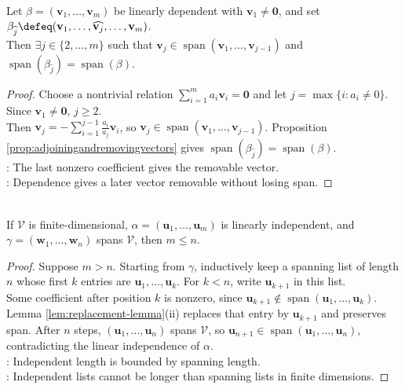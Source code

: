 \begin{lemma} \label{lem:lineardependencelemma} \\
Let $\beta=(\mathbf{v}_1,\ldots,\mathbf{v}_m)$ be linearly dependent with $\mathbf{v}_1\neq\mathbf{0}$, and set $\beta_{\widehat{j}}\defeq(\mathbf{v}_1,\ldots,\widehat{\mathbf{v}_j},\ldots,\mathbf{v}_m)$.\\
Then $\exists j\in\{2,\ldots,m\}$ such that $\mathbf{v}_j\in\operatorname{span}(\mathbf{v}_1,\ldots,\mathbf{v}_{j-1})$ and $\operatorname{span}(\beta_{\widehat{j}})=\operatorname{span}(\beta)$.
\begin{proof}
Choose a nontrivial relation $\sum\limits_{i=1}^m a_i\mathbf{v}_i=\mathbf{0}$ and let $j=\max\{i:a_i\neq0\}$. Since $\mathbf{v}_1\neq\mathbf{0}$, $j\geq2$.\\
Then $\mathbf{v}_j=-\sum\limits_{i=1}^{j-1}\frac{a_i}{a_j}\mathbf{v}_i$, so $\mathbf{v}_j\in\operatorname{span}(\mathbf{v}_1,\ldots,\mathbf{v}_{j-1})$. Proposition \ref{prop:adjoiningandremovingvectors} gives $\operatorname{span}(\beta_{\widehat{j}})=\operatorname{span}(\beta)$.\\
: The last nonzero coefficient gives the removable vector.\\
: Dependence gives a later vector removable without losing span.
\end{proof}
\end{lemma}

\begin{theorem} \label{thm:finitedimlenofvec} \\
If $\mathcal{V}$ is finite-dimensional, $\alpha=(\mathbf{u}_1,\ldots,\mathbf{u}_m)$ is linearly independent, and $\gamma=(\mathbf{w}_1,\ldots,\mathbf{w}_n)$ spans $\mathcal{V}$, then $m\leq n$.
\begin{proof}
Suppose $m>n$. Starting from $\gamma$, inductively keep a spanning list of length $n$ whose first $k$ entries are $\mathbf{u}_1,\ldots,\mathbf{u}_k$. For $k<n$, write $\mathbf{u}_{k+1}$ in this list.\\
Some coefficient after position $k$ is nonzero, since $\mathbf{u}_{k+1}\notin\operatorname{span}(\mathbf{u}_1,\ldots,\mathbf{u}_k)$. Lemma \ref{lem:replacement-lemma}(ii) replaces that entry by $\mathbf{u}_{k+1}$ and preserves span. After $n$ steps, $(\mathbf{u}_1,\ldots,\mathbf{u}_n)$ spans $\mathcal{V}$, so $\mathbf{u}_{n+1}\in\operatorname{span}(\mathbf{u}_1,\ldots,\mathbf{u}_n)$, contradicting the linear independence of $\alpha$.\\
: Independent length is bounded by spanning length.\\
: Independent lists cannot be longer than spanning lists in finite dimensions.
\end{proof}
\end{theorem}


